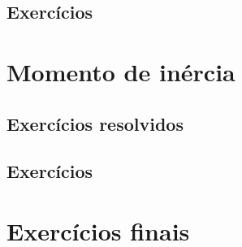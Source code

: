 \construirExeresol


\subsection*{Exercícios}

\construirExer




\section{Momento de inércia}
\construirSec

\subsection*{Exercícios resolvidos}

\construirExeresol


\subsection*{Exercícios}

\construirExer

\section{Exercícios finais}

\construirExer



